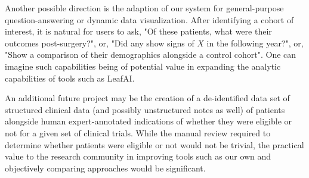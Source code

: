 \documentclass[../main.tex]{subfiles}
\begin{document}
Another possible direction is the adaption of our system for general-purpose question-answering or dynamic data visualization. After identifying a cohort of interest, it is natural for users to ask, "Of these patients, what were their outcomes post-surgery?", or, "Did any show signs of $X$ in the following year?", or, "Show a comparison of their demographics alongside a control cohort". One can imagine such capabilities being of potential value in expanding the analytic capabilities of tools such as LeafAI.

An additional future project may be the creation of a de-identified data set of structured clinical data (and possibly unstructured notes as well) of patients alongside human expert-annotated indications of whether they were eligible or not for a given set of clinical trials. While the manual review required to determine whether patients were eligible or not would not be trivial, the practical value to the research community in improving tools such as our own and objectively comparing approaches would be significant.
\end{document}
